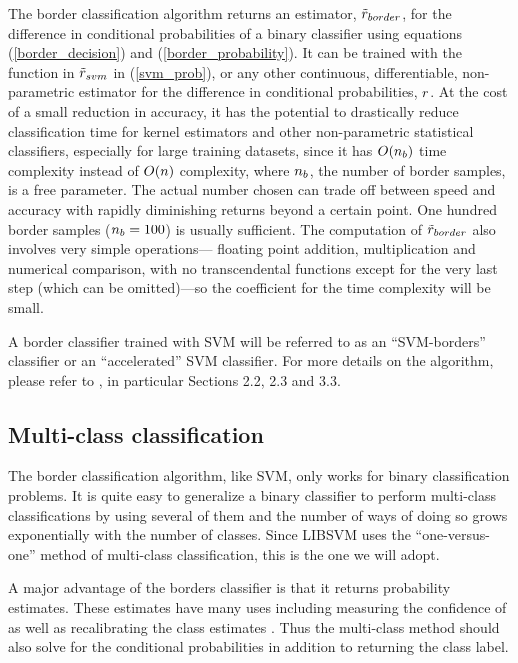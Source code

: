 The border classification algorithm returns an estimator,
$\tilde r_{border}$, for the difference in conditional probabilities of
a binary classifier using
equations (\ref{border_decision}) and (\ref{border_probability}).
It can be trained with the function in $\tilde r_{svm}$ in (\ref{svm_prob}),
or any other 
continuous, differentiable, non-parametric estimator for the difference
in conditional probabilities, $r$.
At the cost of a small reduction in accuracy,
it has the potential to drastically reduce classification time for kernel
estimators and other non-parametric statistical classifiers,
especially for large training datasets,
since it has $O(n_b)$ time complexity instead of $O(n)$
complexity, where $n_b$, the number of border samples, is a free parameter.
The actual number chosen
can trade off between speed and accuracy with rapidly diminishing returns
beyond a certain point. 
One hundred border samples ($n_b=100$) is usually sufficient.
The computation of $\tilde r_{border}$ also involves very simple operations---
floating point addition, multiplication and numerical comparison, with no
transcendental functions except for the very last step (which can be omitted)---so the coefficient for the time complexity will be small.

A border classifier trained with SVM will be referred to as an
``SVM-borders'' classifier or an ``accelerated'' SVM classifier.
For more details on the algorithm, please refer to \citet{Mills2011},
in particular Sections 2.2, 2.3 and 3.3.

\subsection{Multi-class classification}

The border classification algorithm, like SVM, only works for binary 
classification problems. It is quite easy to generalize a binary classifier
to perform multi-class classifications by using several of them and the
number of ways of doing so grows exponentially with the number of classes.
Since LIBSVM uses the ``one-versus-one'' method \citep{Hsu_Lin2002} of 
multi-class classification, this is the one we will adopt. 

A major advantage of the
borders classifier is that it returns probability estimates.
These estimates have many uses including measuring the confidence of as well
as recalibrating the class estimates \citep{Mills2009,Mills2011}.
Thus the multi-class method
should also solve for the conditional probabilities in addition to returning
the class label.

